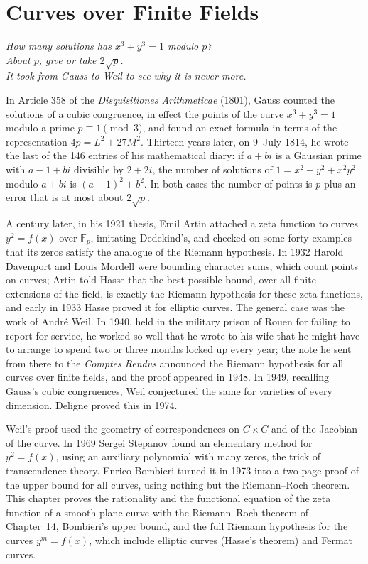 \chapter{Curves over Finite Fields}
\begin{center}\itshape
How many solutions has $x^3+y^3=1$ modulo $p$?\\
About $p$, give or take $2\sqrt p$.\\
It took from Gauss to Weil to see why it is never more.
\end{center}

In Article 358 of the \emph{Disquisitiones Arithmeticae} (1801), Gauss counted the solutions of a cubic congruence, in effect the points of the
curve $x^3+y^3=1$ modulo a prime $p\equiv1\pmod3$, and found an exact formula in terms of the representation $4p=L^2+27M^2$. Thirteen years later, on
9~July 1814, he wrote the last of the 146 entries of his mathematical diary: if $a+bi$ is a Gaussian prime with $a-1+bi$ divisible by $2+2i$, the number of
solutions of $1=x^2+y^2+x^2y^2$ modulo $a+bi$ is $(a-1)^2+b^2$. In both cases the number of points is $p$ plus an error that is at most about $2\sqrt p$.

A century later, in his 1921 thesis, Emil Artin attached a zeta function to curves $y^2=f(x)$ over $\mathbb F_p$, imitating Dedekind's, and checked
on some forty examples that its zeros satisfy the analogue of the Riemann hypothesis. In 1932 Harold Davenport and Louis Mordell were bounding character
sums, which count points on curves; Artin told Hasse that the best possible bound, over all finite extensions of the field, is exactly the Riemann hypothesis for
these zeta functions, and early in 1933 Hasse proved it for elliptic curves. The general case was the work of Andr\'e Weil. In 1940, held in the military prison
of Rouen for failing to report for service, he worked so well that he wrote to his wife that he might have to arrange to spend two or three months locked
up every year; the note he sent from there to the \emph{Comptes Rendus} announced the Riemann hypothesis for all curves over finite fields, and the proof
appeared in 1948. In 1949, recalling Gauss's cubic congruences, Weil conjectured the same for varieties of every dimension. Deligne proved this in 1974.

Weil's proof used the geometry of correspondences on $C\times C$ and of the Jacobian of the curve. In 1969 Sergei Stepanov found an elementary method for $y^2=f(x)$, using an
auxiliary polynomial with many zeros, the trick of transcendence theory. Enrico Bombieri turned it in 1973 into a two-page proof of the upper bound for all
curves, using nothing but the Riemann--Roch theorem. This chapter proves the rationality and the functional equation of the zeta function of a smooth plane
curve with the Riemann--Roch theorem of Chapter~14, Bombieri's upper bound, and the full Riemann hypothesis for the curves $y^m=f(x)$, which include
elliptic curves (Hasse's theorem) and Fermat curves.

